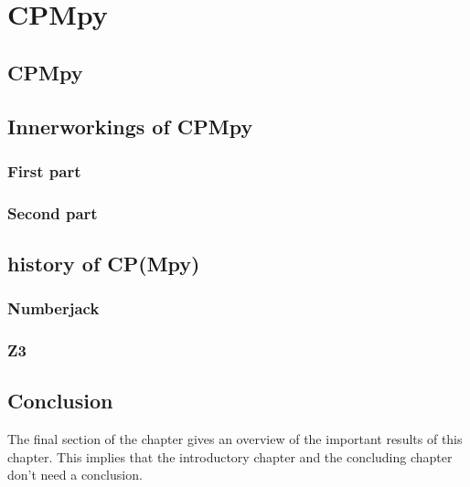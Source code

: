 \chapter{CPMpy}
\label{cha:4}

\section{CPMpy}
\section{Innerworkings of CPMpy}
\subsection{First part}
\subsection{Second part}

\section{history of CP(Mpy)}
\subsection{Numberjack}

\subsection{Z3}

\section{Conclusion}
The final section of the chapter gives an overview of the important results
of this chapter. This implies that the introductory chapter and the
concluding chapter don't need a conclusion.

